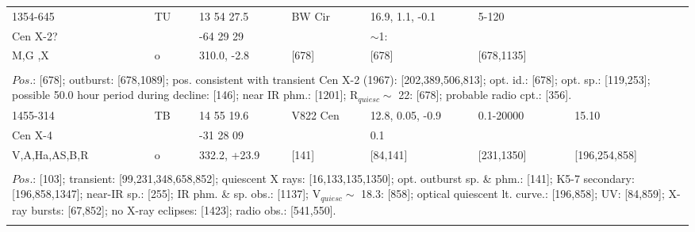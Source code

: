 \documentclass{aa}
\begin{document}
\begin{tabular}{p{2.5cm}p{1cm}p{1.8cm}p{2.3cm}p{3.3cm}p{2.0cm}p{2.2cm}}
\noalign{\smallskip}
1354-645         & TU        & 13 54 27.5      & BW Cir              & 16.9, 1.1, -0.1    & 5-120              &         \\
Cen X-2?        &               & -64 29 29        &                            & $\sim$1:             &                         &         \\
M,G ,X            & o           & 310.0, -2.8        & [678]                  & [678]                   & [678,1135]     &         \\
\\
\multicolumn{7}{p{17.5cm}}{
$Pos$.: [678]; outburst: [678,1089]; pos. consistent with transient Cen X-2 (1967): [202,389,506,813]; opt. id.: [678];
opt. sp.: [119,253]; possible 50.0 hour period during decline: [146]; near IR phm.: [1201]; R$_{quiesc}\sim$ 22: [678]; 
probable radio cpt.: [356].}\\
\noalign{\smallskip}
\hline

\noalign{\smallskip}
1455-314               & TB           & 14 55 19.6          & V822 Cen      & 12.8, 0.05, -0.9      & 0.1-20000       & 15.10                  \\
Cen X-4                 &                 & -31 28 09            &                          & 0.1                           &                          &                             \\
V,A,Ha,AS,B,R    & o              & 332.2, +23.9       & [141]               & [84,141]                  & [231,1350]      & [196,254,858]    \\
\\
\multicolumn{7}{p{17.5cm}}{
$Pos$.: [103]; transient: [99,231,348,658,852]; quiescent X rays: [16,133,135,1350]; opt. outburst sp. \& phm.: [141];
K5-7 secondary: [196,858,1347]; near-IR sp.: [255]; IR phm. \& sp. obs.: [1137]; V$_{quiesc}\sim $ 18.3: [858]; 
optical quiescent lt. curve.: [196,858]; 
UV: [84,859]; X-ray bursts: [67,852]; no X-ray eclipses: [1423]; radio obs.: [541,550].}\\
\noalign{\smallskip}
\hline


\end{tabular}
\end{document}

